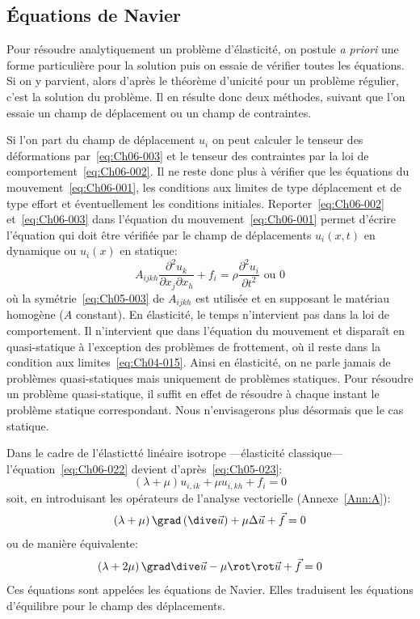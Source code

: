 \subsection{Équations de Navier} \label{ssec:Ch06-1.3}
Pour résoudre analytiquement un problème d'élasticité, on postule \textit{a priori} une forme particulière pour la solution puis on essaie de vérifier toutes les équations.
Si on y parvient, alors d'après le théorème d'unicité pour un problème régulier, c'est la solution du problème.
Il en résulte donc deux méthodes, suivant que l'on essaie un champ de déplacement ou un champ de contraintes.

Si l'on part du champ de déplacement $u_i$ on peut calculer le tenseur des déformations par~\eqref{eq:Ch06-003} et le tenseur des contraintes par la loi de comportement~\eqref{eq:Ch06-002}.
Il ne reste donc plus à vérifier que les équations du mouvement~\eqref{eq:Ch06-001}, les conditions aux limites de type déplacement et de type effort et éventuellement les conditions initiales.
Reporter~\eqref{eq:Ch06-002} et~\eqref{eq:Ch06-003} dans l'équation du mouvement~\eqref{eq:Ch06-001} permet d'écrire l'équation qui doit être vérifiée par le champ de déplacements $u_i\left( x,t \right)$ en dynamique ou $u_i(x)$ en statique:
\begin{equation}
    A_{ijkh} \frac{\partial^2 u_k}{\partial x_j \partial x_h} + f_i = \rho \frac{\partial^2 u_i}{\partial t^2} \text{ ou } 0
    \label{eq:Ch06-022}
\end{equation}
où la symétrie~\eqref{eq:Ch05-003} de $A_{ijkh}$ est utilisée et en supposant le matériau homogène ($A$ constant).
En élasticité, le temps n'intervient pas dans la loi de comportement.
Il n'intervient que dans l'équation du mouvement et disparaît en quasi-statique à l'exception des problèmes de frottement, où il reste dans la condition aux limites~\eqref{eq:Ch04-015}.
Ainsi en élasticité, on ne parle jamais de problèmes quasi-statiques mais uniquement de problèmes statiques.
Pour résoudre un problème quasi-statique, il suffit en effet de résoudre à chaque instant le problème statique correspondant.
Nous n'envisagerons plus désormais que le cas statique.

Dans le cadre de l'élastictté linéaire isotrope ---élasticité classique--- l'équation~\eqref{eq:Ch06-022} devient d'après~\eqref{eq:Ch05-023}:
\begin{equation}
    \left( \lambda + \mu \right) u_{i,ik} + \mu u_{i,kh} + f_i = 0
    \label{eq:Ch06-023}
\end{equation}
soit, en introduisant les opérateurs de l'analyse vectorielle (Annexe~\ref{Ann:A}):
\begin{equation}
    \left( \lambda + \mu \right) \grad \left( \dive \vec{u} \right) + \mu \Delta \vec{u} + \vec{f} = 0
    \label{eq:Ch06-024}
\end{equation}
ou de manière équivalente:
\begin{equation}
    \left( \lambda + 2\mu \right) \grad \dive \vec{u} - \mu \rot \rot \vec{u} + \vec{f} = 0
    \label{eq:Ch06-025}
\end{equation}
Ces équations sont appelées les équations de Navier.
Elles traduisent les équations d'équilibre pour le champ des déplacements.

